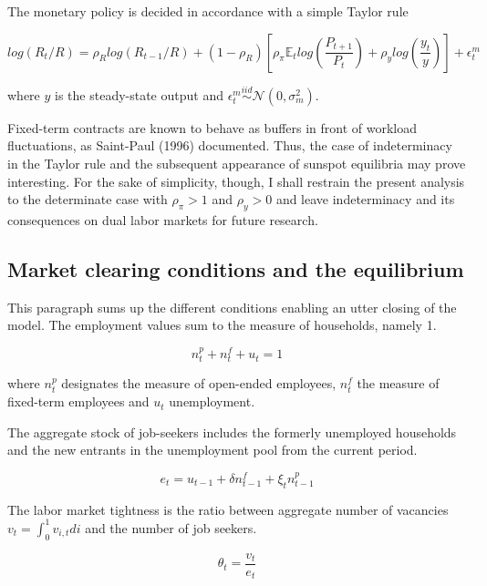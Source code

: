 The monetary policy is decided in accordance with a simple Taylor rule

\begin{equation}
log\left( R_{t} / R \right) = \rho_R log\left( R_{t-1} / R\right) + \left( 1 - \rho_R \right) \left[ \rho_{\pi} \mathbb{E}_t log \left( \frac{P_{t+1}}{P_t} \right) + \rho_y log\left(\frac{y_t}{y}\right) \right] + \epsilon_t^m \label{eq:taylor}
\end{equation}

where $y$ is the steady-state output and $\epsilon_t^m \overset{iid}{\sim} \mathcal{N} \left( 0, \sigma_m^2 \right)$.

Fixed-term contracts are known to behave as buffers in front of workload fluctuations, as Saint-Paul (1996) \cite{saint1996dual} documented. Thus, the case of indeterminacy in the Taylor rule and the subsequent appearance of sunspot equilibria may prove interesting. For the sake of simplicity, though, I shall restrain the present analysis to the determinate case with $\rho_{\pi} > 1$ and $\rho_y > 0$ and leave indeterminacy and its consequences on dual labor markets for future research.

\subsection{Market clearing conditions and the equilibrium}

This paragraph sums up the different conditions enabling an utter closing of the model. The employment values sum to the measure of households, namely 1.

\begin{equation}
n_t^p + n_t^f + u_t = 1
\end{equation}

where $n_t^p$ designates the measure of open-ended employees, $n_t^f$ the measure of fixed-term employees and $u_t$ unemployment.

The aggregate stock of job-seekers includes the formerly unemployed households and the new entrants in the unemployment pool from the current period.

\begin{equation}
e_t = u_{t-1} + \delta n_{t-1}^f + \xi_t n_{t-1}^p
\end{equation}

The labor market tightness is the ratio between aggregate number of vacancies $v_t = \int_{0}^{1} v_{i,t} di$ and the number of job seekers.

\begin{equation*}
\theta_t = \frac{v_t}{e_t}
\end{equation*}

